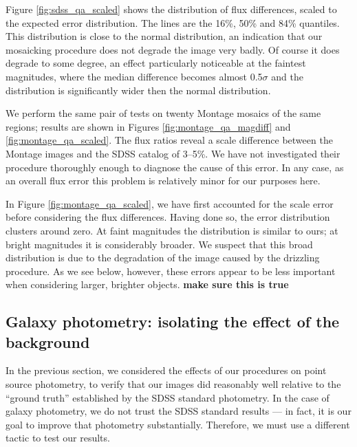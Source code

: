 \documentclass[10pt,preprint]{aastex}
\begin{document}
Figure \ref{fig:sdss_qa_scaled} shows the distribution of flux
differences, scaled to the expected error distribution. The lines are
the 16\%, 50\% and 84\% quantiles. This distribution is close to the
normal distribution, an indication that our mosaicking procedure does
not degrade the image very badly.  Of course it does degrade to some
degree, an effect particularly noticeable at the faintest magnitudes,
where the median difference becomes almost 0.5$\sigma$ and the
distribution is significantly wider then the normal distribution.

We perform the same pair of tests on twenty Montage mosaics of the
same regions; results are shown in Figures
\ref{fig:montage_qa_magdiff} and \ref{fig:montage_qa_scaled}.  The
flux ratios reveal a scale difference between the Montage
images and the SDSS catalog of 3--5\%.
We have not investigated their procedure thoroughly enough to diagnose
the cause of this error.  In any case, as an overall flux error this
problem is relatively minor for our purposes here.

In Figure \ref{fig:montage_qa_scaled}, we have first accounted for the
scale error before considering the flux differences. Having done so,
the error distribution clusters around zero.  At faint magnitudes the
distribution is similar to ours; at bright magnitudes it is
considerably broader. We suspect that this broad distribution is due
to the degradation of the image caused by the drizzling procedure. As
we see below, however, these errors appear to be less important when
considering larger, brighter objects. {\bf make sure this is true}

\subsection{Galaxy photometry: isolating the effect of the background}
\label{sec:simplegal}

In the previous section, we considered the effects of our procedures
on point source photometry, to verify that our images did reasonably
well relative to the ``ground truth'' established by the SDSS standard
photometry.  In the case of galaxy photometry, we do not trust the
SDSS standard results --- in fact, it is our goal to improve that
photometry substantially.  Therefore, we must use a different tactic
to test our results.
\end{document}
